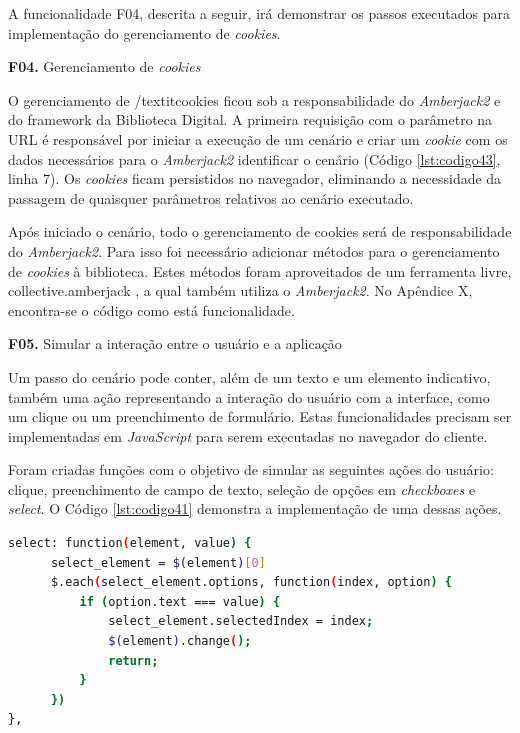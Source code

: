 A funcionalidade F04, descrita a seguir, irá demonstrar os passos executados para implementação do gerenciamento de \textit{cookies}.


\textbf{F04.} Gerenciamento de \textit{cookies}

O gerenciamento de /textit{cookies} ficou sob a responsabilidade do \textit{Amberjack2} e do framework da Biblioteca Digital. A primeira requisição com o parâmetro na URL é responsável por iniciar a execução de um cenário e criar um \textit{cookie} com os dados necessários para o \textit{Amberjack2} identificar o cenário (Código \ref{lst:codigo43}, linha 7). Os \textit{cookies} ficam persistidos no navegador, eliminando a necessidade da passagem de quaisquer parâmetros relativos ao cenário executado.

Após iniciado o cenário, todo o gerenciamento de cookies será de responsabilidade do \textit{Amberjack2}. Para isso foi necessário adicionar métodos para o gerenciamento de \textit{cookies} à biblioteca. Estes métodos foram aproveitados de um ferramenta livre, collective.amberjack \cite{REDTURTLE}, a qual também utiliza o \textit{Amberjack2}. No Apêndice X, encontra-se o código como está funcionalidade.

\textbf{F05.} Simular a interação entre o usuário e a aplicação

Um passo do cenário pode conter, além de um texto e um elemento indicativo, também uma ação representando a interação do usuário com a interface, como um clique ou um preenchimento de formulário. Estas funcionalidades precisam ser implementadas em \textit{JavaScript} para serem executadas no navegador do cliente.

Foram criadas funções com o objetivo de simular as seguintes ações do usuário: clique, preenchimento de campo de texto, seleção de opções em \textit{checkboxes} e \textit{select}. O Código \ref{lst:codigo41} demonstra a implementação de uma dessas ações.

{\singlespace
\begin{lstlisting}[caption=Função para seleção de item em um \textit{select},language=bash,label={lst:codigo41}]
select: function(element, value) {
      select_element = $(element)[0]
      $.each(select_element.options, function(index, option) {
          if (option.text === value) {
              select_element.selectedIndex = index;
              $(element).change();
              return;
          }
      })
},
\end{lstlisting}
}

